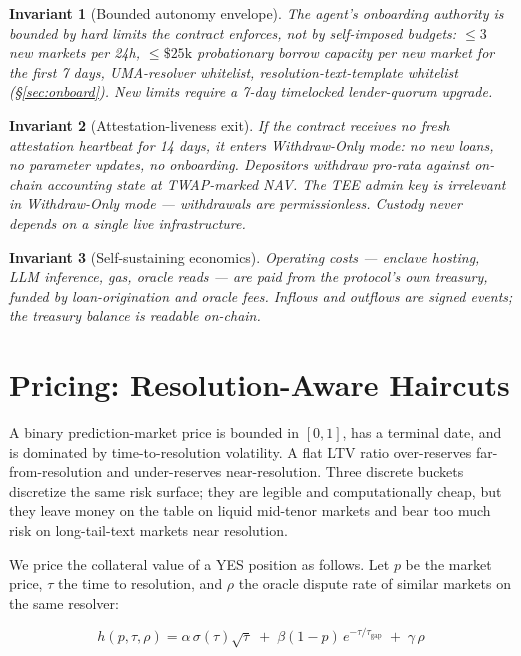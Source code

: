 \documentclass[11pt,letterpaper]{article}
\newtheorem{invariant}{Invariant}
\begin{document}
\begin{invariant}[Bounded autonomy envelope]
The agent's onboarding authority is bounded by hard limits the contract enforces, not by self-imposed budgets: $\leq 3$ new markets per 24h, $\leq \$25\text{k}$ probationary borrow capacity per new market for the first 7 days, UMA-resolver whitelist, resolution-text-template whitelist (\S\ref{sec:onboard}). New limits require a 7-day timelocked lender-quorum upgrade.
\end{invariant}

\begin{invariant}[Attestation-liveness exit]
If the contract receives no fresh attestation heartbeat for 14 days, it enters Withdraw-Only mode: no new loans, no parameter updates, no onboarding. Depositors withdraw pro-rata against on-chain accounting state at TWAP-marked NAV. The TEE admin key is irrelevant in Withdraw-Only mode --- withdrawals are permissionless. Custody never depends on a single live infrastructure.
\end{invariant}

\begin{invariant}[Self-sustaining economics]
Operating costs --- enclave hosting, LLM inference, gas, oracle reads --- are paid from the protocol's own treasury, funded by loan-origination and oracle fees. Inflows and outflows are signed events; the treasury balance is readable on-chain.
\end{invariant}

\section{Pricing: Resolution-Aware Haircuts}
\label{sec:haircut}

A binary prediction-market price is bounded in $[0,1]$, has a terminal date, and is dominated by time-to-resolution volatility. A flat LTV ratio over-reserves far-from-resolution and under-reserves near-resolution. Three discrete buckets discretize the same risk surface; they are legible and computationally cheap, but they leave money on the table on liquid mid-tenor markets and bear too much risk on long-tail-text markets near resolution.

We price the collateral value of a YES position as follows. Let $p$ be the market price, $\tau$ the time to resolution, and $\rho$ the oracle dispute rate of similar markets on the same resolver:

\begin{equation}
\label{eq:haircut}
h(p, \tau, \rho) = \alpha \, \sigma(\tau) \sqrt{\tau} \;+\; \beta (1-p) \, e^{-\tau / \tau_{\mathrm{gap}}} \;+\; \gamma \, \rho
\end{equation}
\end{document}
